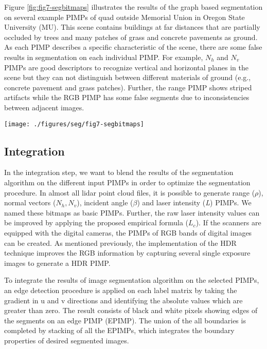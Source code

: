 \documentclass[final,3p,times,twocolumn,authoryear]{elsarticle}
\begin{document}
Figure \ref{fig:fig7-segbitmaps} illustrates the results of the graph based segmentation on several example PIMPs of quad outside Memorial Union in Oregon State University (MU). This scene contains buildings at far distances that are partially occluded by trees and many patches of grass and concrete pavements as ground. As each PIMP describes a specific characteristic of the scene, there are some false results in segmentation on each individual PIMP. For example, $N_h$ and $N_v$ PIMPs are good descriptors to recognize vertical and horizontal planes in the scene but they can not distinguish between different materials of ground (e.g., concrete pavement and grass patches). Further, the range PIMP shows striped artifacts while the RGB PIMP has some false segments due to inconsistencies between adjacent images.  

\begin{figure*}[ht]
	\centering
	\texttt{[image: ./figures/seg/fig7-segbitmaps]}
	\caption{The results of graph based segmentation on generated PIMPs on the generated PIMPs for the MU dataset.}
	\label{fig:fig7-segbitmaps}
\end{figure*}


\subsection{Integration}

In the integration step, we want to blend the results of the segmentation algorithm on the different input PIMPs in order to optimize the segmentation procedure. 
In almost all lidar point cloud files, it is possible to generate range ($\rho$), normal vectors ($N_h, N_v$), incident angle ($\beta$) and laser intensity (\textit{L}) PIMPs. We named these bitmaps as basic PIMPs. Further, the raw laser intensity values can be improved by applying the proposed empirical formula ($L_c$). If the scanners are equipped with the digital cameras, the PIMPs of RGB bands of digital images can be created. As mentioned previously, the implementation of the HDR technique improves the RGB information by capturing several single exposure images to generate a HDR PIMP. 

To integrate the results of image segmentation algorithm on the selected PIMPs, an edge detection procedure is applied on each label matrix by taking the gradient in u and v directions and identifying the absolute values which are greater than zero. The result consists of black and white pixels showing edges of the segments on an edge PIMP (EPIMP). The union of the all boundaries is completed by stacking of all the EPIMPs, which integrates the boundary properties of desired segmented images. 
\end{document}
